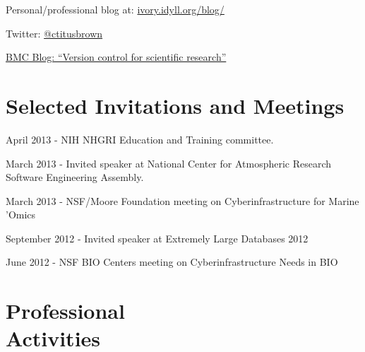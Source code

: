 \documentclass[margin,line]{resume}
\begin{document}
\begin{resume}
Personal/professional blog at: \href{http://ivory.idyll.org/blog/}{ivory.idyll.org/blog/}

Twitter: \href{http://twitter.com/ctitusbrown}{@ctitusbrown}

\href{http://blogs.biomedcentral.com/bmcblog/2013/02/28/version-control-for-scientific-research/}{BMC Blog: ``Version control for scientific research''}

\section{\mysidestyle Selected Invitations and Meetings}

\begin{list1}

\item[] April 2013 - NIH NHGRI Education and Training committee.
\item[] March 2013 - Invited speaker at National Center for Atmospheric Research Software Engineering Assembly.
\item[] March 2013 - NSF/Moore Foundation meeting on Cyberinfrastructure for Marine 'Omics 
\item[] September 2012 - Invited speaker at Extremely Large Databases 2012
\item[] June 2012 - NSF BIO Centers meeting on Cyberinfrastructure Needs in BIO

\end{list1}

    \section{\mysidestyle Professional\\Activities}


\end{resume}
\end{document}
